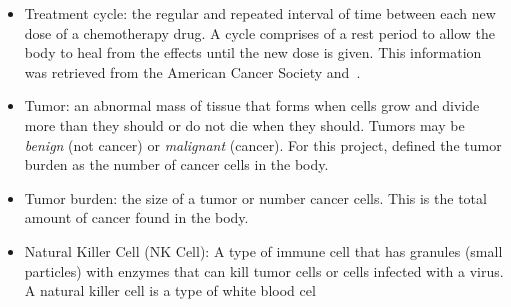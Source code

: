 \documentclass[11pt]{amsart}
\begin{document}
\begin{itemize}
	\item Treatment cycle: the regular and repeated interval of time between each new dose of a chemotherapy drug. A cycle comprises of a rest period to allow the body to heal from the effects until the new dose is given. This information was retrieved from the American Cancer Society and\ \cite{CALEY2012186}.
	\item Tumor: an abnormal mass of tissue that forms when cells grow and divide more than they should or do not die when they should. Tumors may be \textit{benign} (not cancer) or \textit{malignant} (cancer). For this project, defined the tumor burden as the number of cancer cells in the body.
	\item Tumor burden: the size of a tumor or number cancer cells. This is the total amount of cancer found in the body.
        \item Natural Killer Cell (NK Cell): A type of immune cell that has granules (small particles) with enzymes that can kill tumor cells or cells infected with a virus. A natural killer cell is a type of white blood cel
\end{itemize}
\end{document}
